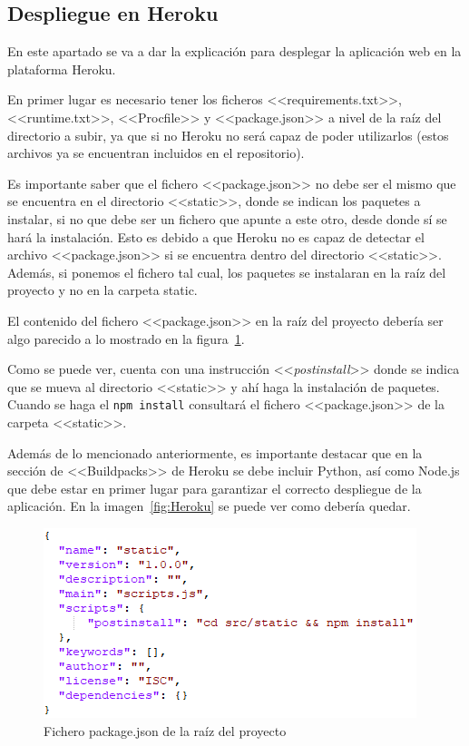 \subsection{Despliegue en Heroku}
En este apartado se va a dar la explicación para desplegar la aplicación web en la plataforma Heroku.

En primer lugar es necesario tener los ficheros <<requirements.txt>>, <<runtime.txt>>, <<Procfile>> y <<package.json>> a nivel de la raíz del directorio a subir, ya que si no Heroku no será capaz de poder utilizarlos (estos archivos ya se encuentran incluidos en el repositorio).

Es importante saber que el fichero <<package.json>> no debe ser el mismo que se encuentra en el directorio <<static>>, donde se indican los paquetes a instalar, si no que debe ser un fichero que apunte a este otro, desde donde sí se hará la instalación. 
Esto es debido a que Heroku no es capaz de detectar el archivo <<package.json>> si se encuentra dentro del directorio <<static>>. Además, si ponemos el fichero tal cual, los paquetes se instalaran en la raíz del proyecto y no en la carpeta static.

El contenido del fichero <<package.json>> en la raíz del proyecto debería ser algo parecido a lo mostrado en la figura~\ref{fig:ficheroPackage}.

Como se puede ver, cuenta con una instrucción <<\textit{postinstall}>> donde se indica que se mueva al directorio <<static>> y ahí haga la instalación de paquetes.
Cuando se haga el \texttt{npm install} consultará el fichero <<package.json>> de la carpeta <<static>>.

Además de lo mencionado anteriormente, es importante destacar que en la sección de <<Buildpacks>> de Heroku se debe incluir Python, así como Node.js que debe estar en primer lugar para garantizar el correcto despliegue de la aplicación.
En la imagen~\ref{fig:Heroku} se puede ver como debería quedar.

\begin{figure}
	\centering
	\includegraphics[width=.8\textwidth]{../img/Anexos/ManualProgramador/package.png}
	\caption{Fichero package.json de la raíz del proyecto}\label{fig:ficheroPackage}
\end{figure}

